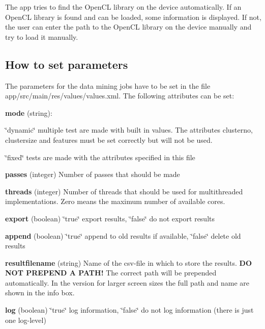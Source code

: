The app tries to find the Open\+CL library on the device automatically. If an Open\+CL library is found and can be loaded, some information is displayed. If not, the user can enter the path to the Open\+CL library on the device manually and try to load it manually.

\subsection*{How to set parameters}

The parameters for the data mining jobs have to be set in the file app/src/main/res/values/values.\+xml. The following attributes can be set\+:


\begin{DoxyItemize}
\item {\bfseries mode} (string)\+:
\begin{DoxyItemize}
\item \char`\"{}dynamic\char`\"{} multiple test are made with built in values. The attributes \textquotesingle{}clusterno\textquotesingle{}, \textquotesingle{}clustersize\textquotesingle{} and \textquotesingle{}features\textquotesingle{} must be set correctly but will not be used.
\item \char`\"{}fixed\char`\"{} tests are made with the attributes specified in this file
\end{DoxyItemize}
\item {\bfseries passes} (integer) Number of passes that should be made
\item {\bfseries threads} (integer) Number of threads that should be used for multithreaded implementations. Zero means the maximum number of available cores.
\item {\bfseries export} (boolean) \char`\"{}true\char`\"{} export results, \char`\"{}false\char`\"{} do not export results
\item {\bfseries append} (boolean) \char`\"{}true\char`\"{} append to old results if available, \char`\"{}false\char`\"{} delete old results
\item {\bfseries resultfilename} (string) Name of the csv-\/file in which to store the results. {\bfseries DO N\+OT P\+R\+E\+P\+E\+ND A P\+A\+T\+H!} The correct path will be prepended automatically. In the version for larger screen sizes the full path and name are shown in the info box.
\item {\bfseries log} (boolean) \char`\"{}true\char`\"{} log information, \char`\"{}false\char`\"{} do not log information (there is just one log-\/level)

\end{DoxyItemize}
